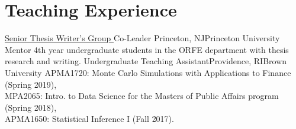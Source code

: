 \documentclass[10pt,a4paper,roman]{moderncv}        %
\begin{document}

\vspace{-0.3cm}
\section{Teaching Experience}
{\color{blue}\href{https://orfe.princeton.edu/undergraduate/stwg}{Senior Thesis
    Writer's Group }\color{black} Co-Leader}
{Princeton, NJ}{Princeton University}
{Mentor 4th year undergraduate students in the ORFE department with thesis research and writing.}
{Undergraduate Teaching Assistant}{Providence, RI}{Brown University}
{APMA1720: Monte Carlo Simulations with Applications to Finance (Spring 2019), \\
MPA2065: Intro. to Data Science for the Masters of Public Affairs program (Spring 2018),
\\
APMA1650: Statistical Inference I (Fall 2017).
}
\end{document}
